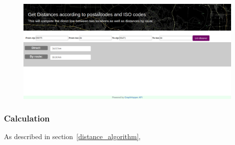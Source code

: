 \begin{figure}[H]
\hspace{-2.0cm}
\includegraphics[width=1.3\textwidth]{img/webapp}
\label{fig:webapp}
\end{figure}

\subsubsection{Calculation}

As described in section~\ref{distance_algorithm},
